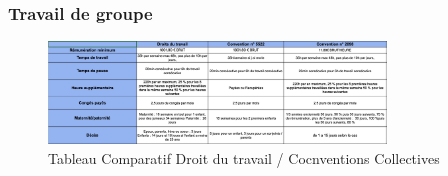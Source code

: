 \documentclass[a4paper,12pt]{article}
\begin{document}
\subsubsection*{Travail de groupe}
\begin{figure}[h!]
    \centering
    \includegraphics[width=0.8\textwidth]{Tableau Comparatif.png}
    \caption{Tableau Comparatif Droit du travail / Cocnventions Collectives}
    \label{fig:capture1}
\end{figure}
\end{document}
